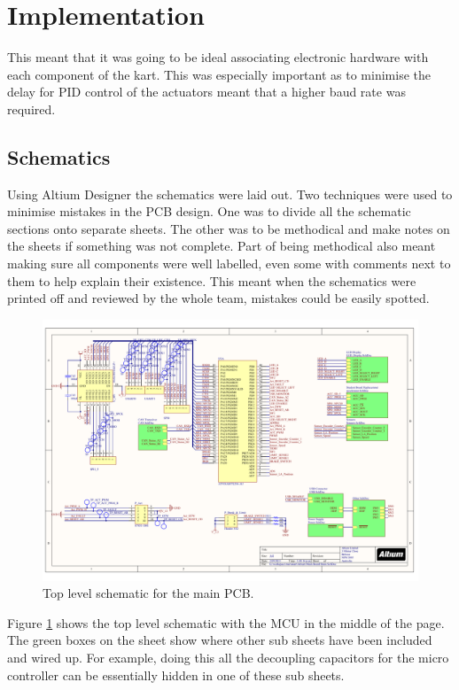 \section{Implementation}
  This meant that it was going to be ideal associating electronic hardware with
  each component of the kart. This was especially important as to minimise the
  delay for PID control of the actuators meant that a higher baud rate was
  required. 

  \subsection{Schematics}
  Using Altium Designer the schematics were laid out. Two techniques were used
  to minimise mistakes in the PCB design. One was to divide all the schematic
  sections onto separate sheets. The other was to be methodical and make notes
  on the sheets if something was not complete. Part of being methodical also
  meant making sure all components were well labelled, even some with comments
  next to them to help explain their existence. This meant when the schematics
  were printed off and reviewed by the whole team, mistakes could be easily
  spotted.
  
  \begin{figure}[h]
      \centering
      \includegraphics[width=\linewidth]{../../Presentation/Henry/Images/Schematic.pdf}
      \caption{Top level schematic for the main PCB.}
      \label{main-schematic}
  \end{figure}

  Figure \ref{main-schematic} shows the top level schematic with the MCU in the
  middle of the page. The green boxes on the sheet show where other sub sheets
  have been included and wired up. For example, doing this all the decoupling
  capacitors for the micro controller can be essentially hidden in one of these
  sub sheets. 

